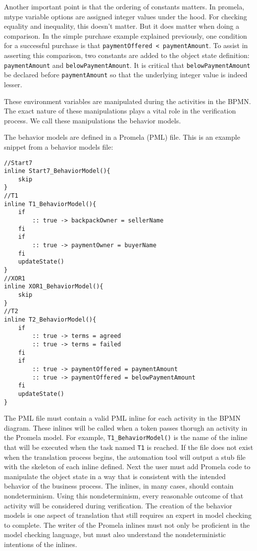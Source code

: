 Another important point is that the ordering of constants matters. In promela, mtype variable options are assigned integer values under the hood. For checking equality and inequality, this doesn't matter. But it does matter when doing a comparison. In the simple purchase example explained previously, one condition for a successful purchase is that \lstinline[style=myPromela]{paymentOffered < paymentAmount}. 
To assist in asserting this comparison, two constants are added to the object state definition: 
\lstinline[style=myPromela]{paymentAmount}
and \lstinline[style=myPromela]{belowPaymentAmount}. 
It is critical that \lstinline[style=myPromela]{belowPaymentAmount} 
be declared before \lstinline[style=myPromela]{paymentAmount} so that the underlying integer value is indeed lesser.

These environment variables are manipulated during the activities in the BPMN. The exact nature of these manipulations plays a vital role in the verification process. We call these manipulations the behavior models.

The behavior models are defined in a Promela (PML) file. This is an example snippet from a behavior models file:
%
{\small
\begin{lstlisting}[style=myPromela]
//Start7
inline Start7_BehaviorModel(){
	skip
}
//T1
inline T1_BehaviorModel(){
	if
		:: true -> backpackOwner = sellerName
	fi
	if
		:: true -> paymentOwner = buyerName
	fi
	updateState()
}
//XOR1
inline XOR1_BehaviorModel(){
	skip
}
//T2
inline T2_BehaviorModel(){
	if
		:: true -> terms = agreed
		:: true -> terms = failed
	fi
	if
		:: true -> paymentOffered = paymentAmount
		:: true -> paymentOffered = belowPaymentAmount
	fi
	updateState()
}
\end{lstlisting}
}
%
The PML file must contain a valid PML inline for each activity in the BPMN diagram. These inlines will be called when a token passes thorugh an activity in the Promela model. For example, \lstinline[style=myPromela]{T1_BehaviorModel()}
is the name of the inline that will be executed when the task named \lstinline[style=mypromela]{T1} 
is reached. If the file does not exist when the translation process begins, the automation tool will output a stub file with the skeleton of each inline defined. Next the user must add Promela code to manipulate the object state in a way that is consistent with the intended behavior of the business process.  The inlines, in many cases, should contain nondeterminism. Using this nondeterminism, every reasonable outcome of that activity will be considered during verification. The creation of the behavior models is one aspect of translation that still requires an expert in model checking to complete. The writer of the Promela inlines must not only be proficient in the model checking language, but must also understand the nondeterministic intentions of the inlines. 

